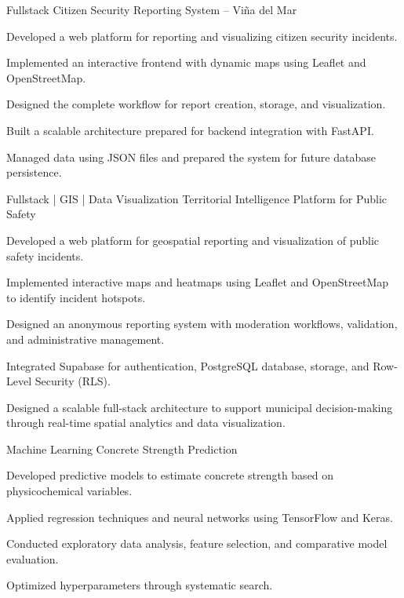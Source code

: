 \begin{cventries}
\cventry
  {Fullstack}
  {Citizen Security Reporting System – Viña del Mar}
  {}
  {}
  {
    \begin{cvitems}
      \item {Developed a web platform for reporting and visualizing citizen security incidents.}
      \item {Implemented an interactive frontend with dynamic maps using Leaflet and OpenStreetMap.}
      \item {Designed the complete workflow for report creation, storage, and visualization.}
      \item {Built a scalable architecture prepared for backend integration with FastAPI.}
      \item {Managed data using JSON files and prepared the system for future database persistence.}
    \end{cvitems}
    \vspace{5mm}
  }
\cventry
  {Fullstack | GIS | Data Visualization}
  {Territorial Intelligence Platform for Public Safety}
  {}
  {}
  {
    \begin{cvitems}
      \item {Developed a web platform for geospatial reporting and visualization of public safety incidents.}
      \item {Implemented interactive maps and heatmaps using Leaflet and OpenStreetMap to identify incident hotspots.}
      \item {Designed an anonymous reporting system with moderation workflows, validation, and administrative management.}
      \item {Integrated Supabase for authentication, PostgreSQL database, storage, and Row-Level Security (RLS).}
      \item {Designed a scalable full-stack architecture to support municipal decision-making through real-time spatial analytics and data visualization.}
    \end{cvitems}
    \vspace{5mm}
  }
\cventry
  {Machine Learning}
  {Concrete Strength Prediction}
  {}
  {}
  {
    \begin{cvitems}
      \item {Developed predictive models to estimate concrete strength based on physicochemical variables.}
      \item {Applied regression techniques and neural networks using TensorFlow and Keras.}
      \item {Conducted exploratory data analysis, feature selection, and comparative model evaluation.}
      \item {Optimized hyperparameters through systematic search.}
    \end{cvitems}
    \vspace{5mm}
  }


\end{cventries}
